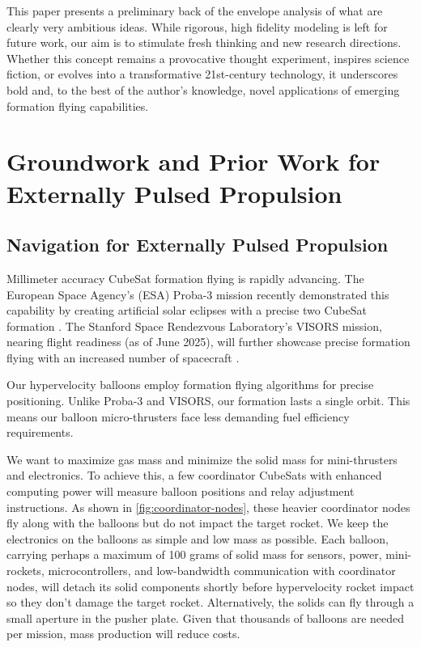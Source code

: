 \documentclass{article}
\begin{document}
This paper presents a preliminary back of the envelope analysis of what are clearly very ambitious ideas. While rigorous, high fidelity modeling is left for future work, our aim is to stimulate fresh thinking and new research directions. Whether this concept remains a provocative thought experiment, inspires science fiction, or evolves into a transformative 21st-century technology, it underscores bold and, to the best of the author's knowledge, novel applications of emerging formation flying capabilities. 

\section{Groundwork and Prior Work for Externally Pulsed Propulsion}
\subsection{Navigation for Externally Pulsed Propulsion}
Millimeter accuracy CubeSat formation flying is rapidly advancing. The European Space Agency's (ESA) Proba-3 mission recently demonstrated this capability by creating artificial solar eclipses with a precise two CubeSat formation \cite{esa_proba_3}. The Stanford Space Rendezvous Laboratory's VISORS mission, nearing flight readiness (as of June 2025), will further showcase precise formation flying with an increased number of spacecraft \cite{guffanti2023autonomous}.  

Our hypervelocity balloons employ formation flying algorithms for precise positioning.  Unlike Proba-3 and VISORS, our formation lasts a single orbit. This means our balloon micro-thrusters face less demanding fuel efficiency requirements.

We want to maximize gas mass and minimize the solid mass for mini-thrusters and electronics. To achieve this, a few coordinator CubeSats with enhanced computing power will measure balloon positions and relay adjustment instructions.  As shown in \autoref{fig:coordinator-nodes}, these heavier coordinator nodes fly along with the balloons but do not impact the target rocket.  We keep the electronics on the balloons as simple and low mass as possible.   Each balloon, carrying perhaps a maximum of 100 grams of solid mass for sensors, power, mini-rockets, microcontrollers, and low-bandwidth communication with coordinator nodes, will detach its solid components shortly before hypervelocity rocket impact so they don't damage the target rocket.    Alternatively, the solids can fly through a small aperture in the pusher plate. Given that thousands of balloons are needed per mission, mass production will reduce costs.    
\end{document}
